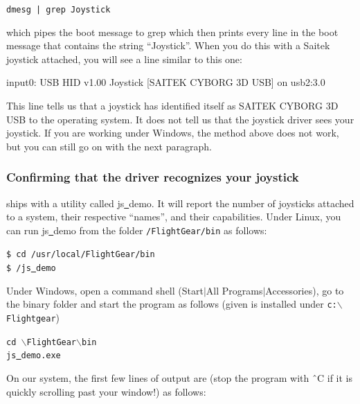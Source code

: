 	\texttt{dmesg | grep Joystick}
\medskip

\noindent
which pipes the boot message to grep which then prints every line in the
boot message that contains the string ``Joystick''.  When you do this with a
Saitek joystick attached, you will see a line similar to this one:
\medskip

\begin{ttfamily}
\noindent
   input0: USB HID v1.00 Joystick [SAITEK CYBORG 3D USB] on usb2:3.0
\end{ttfamily}
\medskip

\noindent
This line tells us that a joystick has identified itself as SAITEK CYBORG 3D USB to the operating system.  It does not tell us that the joystick driver sees your joystick. If you are working under Windows, the method above does not work, but you can still go on with the next paragraph.

\subsubsection{Confirming that the driver recognizes your joystick\label{confirming}}
\FlightGear{} ships with a utility called js\underline{~}demo. It will report the number of joysticks attached to a system, their respective ``names'', and their capabilities. Under Linux, you can run js\underline{~}demo from the folder \texttt{/FlightGear/bin} as follows:
\medskip

\noindent
	\texttt{\$ cd /usr/local/FlightGear/bin}\\	
	\texttt{\$ \./js\underline{~}demo}
\medskip

\noindent
Under Windows, open a command shell (Start$\left|\right.$All Programs$\left|\right.$Accessories), go to the \FlightGear{} binary folder and start the program as follows (given \FlightGear{} is installed under \texttt{c:$\backslash$Flightgear})
\medskip

\noindent
	\texttt{cd {$\backslash$}FlightGear{$\backslash$}bin}\\	
	\texttt{js\underline{~}demo.exe}
\medskip

On our system, the first few lines of output are (stop the program with \^{~}C if it is quickly scrolling  past your window!) as follows:
\medskip


